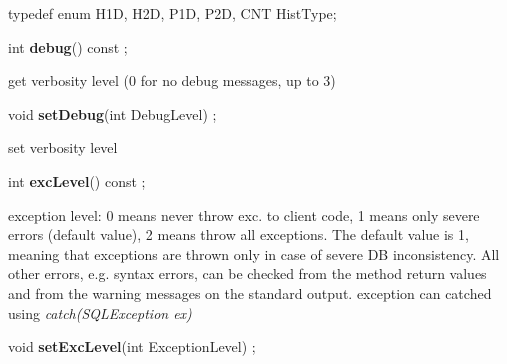 \item   typedef enum { H1D, H2D, P1D, P2D, CNT} HistType;
\item    int {\bf debug}() const ;

 get verbosity level (0 for no debug messages, up to 3)


\item    void {\bf setDebug}(int DebugLevel) ;

 set verbosity level


\item    int {\bf excLevel}() const ;

 exception level: 0 means never throw exc. to client code, 1 means only
 severe errors (default value), 2 means throw all exceptions.
 The default value is 1, meaning that exceptions are thrown only in
 case of severe DB inconsistency. All other errors, e.g. syntax errors,
 can be checked from the method return values and from the warning
 messages on the standard output.
 exception can catched using {\it catch(SQLException ex)}


\item    void {\bf setExcLevel}(int ExceptionLevel) ;




